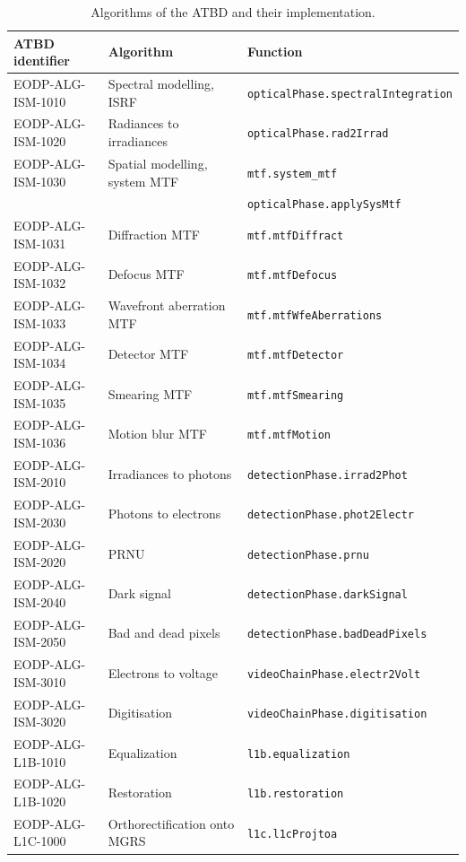 \begin{table}[H]
\centering
\small
\caption{Algorithms of the ATBD and their implementation.}
\label{tab:trace}
\begin{tabular}{lll}
\toprule
ATBD identifier & Algorithm & Function \\
\midrule
EODP-ALG-ISM-1010 & Spectral modelling, ISRF & \texttt{opticalPhase.spectralIntegration} \\
EODP-ALG-ISM-1020 & Radiances to irradiances & \texttt{opticalPhase.rad2Irrad} \\
EODP-ALG-ISM-1030 & Spatial modelling, system MTF & \texttt{mtf.system\_mtf} \\
 & & \texttt{opticalPhase.applySysMtf} \\
EODP-ALG-ISM-1031 & Diffraction MTF & \texttt{mtf.mtfDiffract} \\
EODP-ALG-ISM-1032 & Defocus MTF & \texttt{mtf.mtfDefocus} \\
EODP-ALG-ISM-1033 & Wavefront aberration MTF & \texttt{mtf.mtfWfeAberrations} \\
EODP-ALG-ISM-1034 & Detector MTF & \texttt{mtf.mtfDetector} \\
EODP-ALG-ISM-1035 & Smearing MTF & \texttt{mtf.mtfSmearing} \\
EODP-ALG-ISM-1036 & Motion blur MTF & \texttt{mtf.mtfMotion} \\
EODP-ALG-ISM-2010 & Irradiances to photons & \texttt{detectionPhase.irrad2Phot} \\
EODP-ALG-ISM-2030 & Photons to electrons & \texttt{detectionPhase.phot2Electr} \\
EODP-ALG-ISM-2020 & PRNU & \texttt{detectionPhase.prnu} \\
EODP-ALG-ISM-2040 & Dark signal & \texttt{detectionPhase.darkSignal} \\
EODP-ALG-ISM-2050 & Bad and dead pixels & \texttt{detectionPhase.badDeadPixels} \\
EODP-ALG-ISM-3010 & Electrons to voltage & \texttt{videoChainPhase.electr2Volt} \\
EODP-ALG-ISM-3020 & Digitisation & \texttt{videoChainPhase.digitisation} \\
EODP-ALG-L1B-1010 & Equalization & \texttt{l1b.equalization} \\
EODP-ALG-L1B-1020 & Restoration & \texttt{l1b.restoration} \\
EODP-ALG-L1C-1000 & Orthorectification onto MGRS & \texttt{l1c.l1cProjtoa} \\
\bottomrule
\end{tabular}
\end{table}
